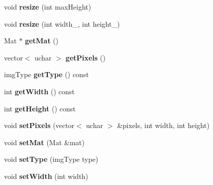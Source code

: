 \begin{DoxyCompactItemize}
\item 
\hypertarget{class_image_a3b2b0b209ce9fa05ac86e434635385b6}{void {\bfseries resize} (int max\-Height)}\label{class_image_a3b2b0b209ce9fa05ac86e434635385b6}

\item 
\hypertarget{class_image_a3c71a8e60be0adb70a9ee7aa2101f2a1}{void {\bfseries resize} (int width\-\_\-, int height\-\_\-)}\label{class_image_a3c71a8e60be0adb70a9ee7aa2101f2a1}

\item 
\hypertarget{class_image_ac7db46ef48be05f16f1a48568609b2b7}{Mat $\ast$ {\bfseries get\-Mat} ()}\label{class_image_ac7db46ef48be05f16f1a48568609b2b7}

\item 
\hypertarget{class_image_a967ec7a693253014cc8ade9eee1b1c12}{vector$<$ uchar $>$ {\bfseries get\-Pixels} ()}\label{class_image_a967ec7a693253014cc8ade9eee1b1c12}

\item 
\hypertarget{class_image_a31258142b60882231d1b8ba999cd6d88}{img\-Type {\bfseries get\-Type} () const }\label{class_image_a31258142b60882231d1b8ba999cd6d88}

\item 
\hypertarget{class_image_adbe5f8b9f79338c7eb6a66bdc69ca0b7}{int {\bfseries get\-Width} () const }\label{class_image_adbe5f8b9f79338c7eb6a66bdc69ca0b7}

\item 
\hypertarget{class_image_a45dd31ebd02682c5963858f62aa53dd9}{int {\bfseries get\-Height} () const }\label{class_image_a45dd31ebd02682c5963858f62aa53dd9}

\item 
\hypertarget{class_image_ab0a38137a9077dc382bbbdd00efcc70b}{void {\bfseries set\-Pixels} (vector$<$ uchar $>$ \&pixels, int width, int height)}\label{class_image_ab0a38137a9077dc382bbbdd00efcc70b}

\item 
\hypertarget{class_image_a1c0874758106668b22c312fe9904cbfe}{void {\bfseries set\-Mat} (Mat \&mat)}\label{class_image_a1c0874758106668b22c312fe9904cbfe}

\item 
\hypertarget{class_image_a1e881fec68466ad342c6a85cff07a42f}{void {\bfseries set\-Type} (img\-Type type)}\label{class_image_a1e881fec68466ad342c6a85cff07a42f}

\item 
\hypertarget{class_image_a2087192970c1d0358e6d7d96d940ed18}{void {\bfseries set\-Width} (int width)}\label{class_image_a2087192970c1d0358e6d7d96d940ed18}


\end{DoxyCompactItemize}
